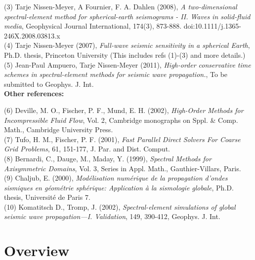 \documentclass[11pt,letter,fleqn,english,notitlepage]{article}
\begin{document}
(3) Tarje Nissen-Meyer, A Fournier, F. A. Dahlen (2008),  
\textit{A two-dimensional spectral-element method for   
spherical-earth seismograms - II. Waves in solid-fluid media},
Geophysical Journal International, 174(3), 873-888.
doi:10.1111/j.1365-246X.2008.03813.x\\

(4) Tarje Nissen-Meyer (2007),
\textit{Full-wave seismic sensitivity in a spherical Earth},
Ph.D. thesis, Princeton University
(This includes refs (1)-(3) and more details.)\\

(5) Jean-Paul Ampuero, Tarje Nissen-Meyer (2011),
\textit{High-order conservative time schemes in spectral-element methods 
for seismic wave propagation.}, To be submitted to Geophys. J. Int.\\


\noindent \textbf{Other references:}\vspace*{0.2cm}

(6) Deville, M. O., Fischer, P. F., Mund, E. H. (2002), 
\textit{High-Order Methods for Incompressible Fluid Flow}, 
Vol. 2, Cambridge monographs on Sppl. \& Comp. Math., Cambridge University Press.\\

(7) Tufo, H. M., Fischer, P. F. (2001), \textit{Fast Parallel Direct Solvers For Coarse Grid Problems}, 
61, 151-177, J. Par. and Dist. Comput.\\

(8) Bernardi, C., Dauge, M., Maday, Y. (1999), \textit{Spectral Methods for Axisymmetric Domains}, 
Vol. 3, Series in Appl. Math., Gauthier-Villars, Paris.\\

(9) Chaljub, E. (2000), \textit{Mod{\'{e}}lisation num{\'{e}}rique de la 
propagation d'ondes sismiques en g{\'{e}}om{\'{e}}trie sph{\'{e}}rique:
Application {\`{a}} la sismologie globale}, 
Ph.D. thesis, Universit{\'{e}} de Paris 7.\\

(10) Komatitsch D., Tromp, J. (2002), \textit{Spectral-element simulations of
global seismic wave propagation---I. Validation},
149, 390-412, Geophys. J. Int.

\section{Overview}
\end{document}
